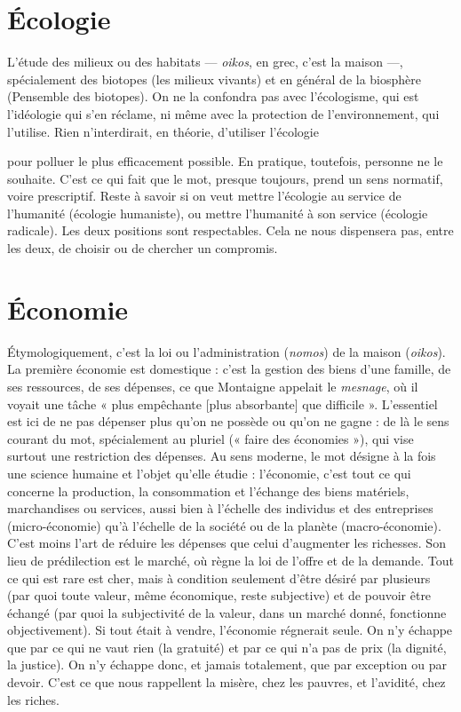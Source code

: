 \section{Écologie}
L'étude des milieux ou des habitats — {\it oikos}, en grec, c’est la maison —,
spécialement des biotopes (les milieux vivants) et en
général de la biosphère (Pensemble des biotopes). On ne la confondra pas avec
l’écologisme, qui est l’idéologie qui s’en réclame, ni même avec la protection de
l’environnement, qui l'utilise. Rien n’interdirait, en théorie, d’utiliser l'écologie

pour polluer le plus efficacement possible. En pratique, toutefois, personne
ne le souhaite. C’est ce qui fait que le mot, presque toujours, prend un sens
normatif, voire prescriptif. Reste à savoir si on veut mettre l’écologie au service
de l'humanité (écologie humaniste), ou mettre l’humanité à son service (écologie
radicale). Les deux positions sont respectables. Cela ne nous dispensera
pas, entre les deux, de choisir ou de chercher un compromis.

\section{Économie}
Étymologiquement, c’est la loi ou l’administration ({\it nomos}) de
la maison ({\it oikos}). La première économie est domestique : c’est
la gestion des biens d’une famille, de ses ressources, de ses dépenses, ce que
Montaigne appelait le {\it mesnage}, où il voyait une tâche « plus empêchante [plus
absorbante] que difficile ». L'essentiel est ici de ne pas dépenser plus qu’on ne
possède ou qu’on ne gagne : de là le sens courant du mot, spécialement au pluriel
(« faire des économies »), qui vise surtout une restriction des dépenses. Au
sens moderne, le mot désigne à la fois une science humaine et l’objet qu’elle
étudie : l’économie, c’est tout ce qui concerne la production, la consommation
et l’échange des biens matériels, marchandises ou services, aussi bien à l’échelle
des individus et des entreprises (micro-économie) qu’à l'échelle de la société ou
de la planète (macro-économie). C’est moins l’art de réduire les dépenses que
celui d’augmenter les richesses. Son lieu de prédilection est le marché, où règne
la loi de l'offre et de la demande. Tout ce qui est rare est cher, mais à condition
seulement d’être désiré par plusieurs (par quoi toute valeur, même économique,
reste subjective) et de pouvoir être échangé (par quoi la subjectivité de
la valeur, dans un marché donné, fonctionne objectivement). Si tout était à
vendre, l’économie régnerait seule. On n’y échappe que par ce qui ne vaut rien
(la gratuité) et par ce qui n’a pas de prix (la dignité, la justice). On n’y échappe
donc, et jamais totalement, que par exception ou par devoir. C’est ce que nous
rappellent la misère, chez les pauvres, et l’avidité, chez les riches.

